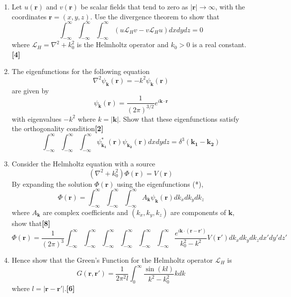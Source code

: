\documentclass[a4paper]{article}
\begin{document}
\begin{qns}\leavevmode
\begin{enumerate}[label=(\roman*)]
\item Let $u(\mathbf{r})$ and $v(\mathbf{r})$ be scalar fields that tend to zero as $|\mathbf{r}|\rightarrow\infty$, with the coordinates $\mathbf{r} = (x, y, z)$. Use the divergence theorem to show that
$$\int_{-\infty}^\infty \int_{-\infty}^\infty\int_{-\infty}^\infty (u\mathcal{L}_Hv-v\mathcal{L}_Hu)dxdydz=0$$
where $\mathcal{L}_H=\nabla^2+k_0^2$ is the Helmholtz operator and $k_0>0$ is a real constant.\hfill\textbf{[4]}
\item The eigenfunctions for the following equation
$$\nabla^2\psi_\mathbf{k}(\mathbf{r})=-k^2\psi_\mathbf{k}(\mathbf{r})$$
are given by
\begin{equation}
  \psi_\mathbf{k}(\mathbf{r})=\frac{1}{(2\pi)^{3/2}}e^{i\mathbf{k}\cdot\mathbf{r}}\tag{*}  
\end{equation}
with eigenvalues $−k^2$ where $k=|\mathbf{k}|$. Show that these eigenfunctions satisfy the orthogonality condition\hfill\textbf{[2]}
$$\int_{-\infty}^\infty\int_{-\infty}^\infty\int_{-\infty}^\infty \psi^*_{\mathbf{k_1}}(\mathbf{r})\psi_{\mathbf{k_2}}(\mathbf{r})dxdydz=\delta^3(\mathbf{k_1}-\mathbf{k_2})$$
\item Consider the Helmholtz equation with a source
$$(\nabla^2+k_0^2)\Phi(\mathbf{r})=V(\mathbf{r})$$
By expanding the solution $\Phi(\mathbf{r})$ using the eigenfunctions (*),
$$\Phi(\mathbf{r})=\int_{-\infty}^\infty\int_{-\infty}^\infty\int_{-\infty}^\infty A_\mathbf{k}\psi_\mathbf{k}(\mathbf{r})dk_xdk_ydk_z$$
where $A_\mathbf{k}$ are complex coefficients and $(k_x, k_y, k_z)$ are components of $\mathbf{k}$, show that\hfill\textbf{[8]}
$$\Phi(\mathbf{r})=\frac{1}{(2\pi)^3}\int_{-\infty}^\infty\int_{-\infty}^\infty\int_{-\infty}^\infty\int_{-\infty}^\infty\int_{-\infty}^\infty\int_{-\infty}^\infty\frac{e^{i\mathbf{k}\cdot(\mathbf{r}-\mathbf{r'})}}{k_0^2-k^2}V(\mathbf{r'})dk_xdk_ydk_zdx'dy'dz'$$
\item Hence show that the Green’s Function for the Helmholtz operator $\mathcal{L}_H$ is
$$G(\mathbf{r},\mathbf{r'})=\frac{1}{2\pi^2l}\int_0^\infty\frac{\sin(kl)}{k^2-k_0^2}kdk$$
where $l=|\mathbf{r}-\mathbf{r'}|$.\hfill\textbf{[6]}
\end{enumerate}
\end{qns}
\newpage
\end{document}
